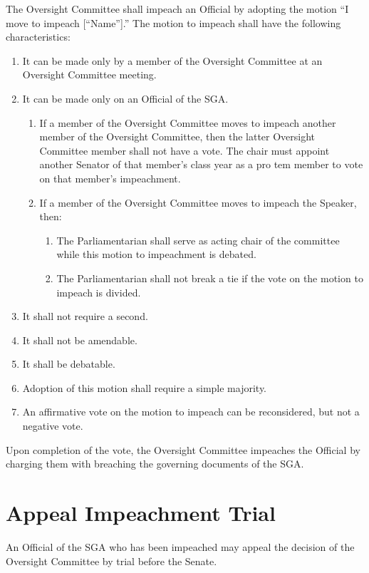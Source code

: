 \documentclass[12pt]{scrreprt}
\begin{document}
The Oversight Committee shall impeach an Official by adopting the motion “I move to impeach
[“Name”].” The motion to impeach shall have the following characteristics: 
\begin{enumerate}
    \item It can be made only by a member of the Oversight Committee at an Oversight Committee
meeting.
    \item It can be made only on an Official of the SGA.
    \begin{enumerate}
        \item If a member of the Oversight Committee moves to impeach another member of the
Oversight Committee, then the latter Oversight Committee member shall not have a vote.
The chair must appoint another Senator of that member’s class year as a pro tem member
to vote on that member’s impeachment.
        \item If a member of the Oversight Committee moves to impeach the Speaker, then:
        \begin{enumerate}
            \item The Parliamentarian shall serve as acting chair of the committee while this
motion to impeachment is debated.
            \item The Parliamentarian shall not break a tie if the vote on the motion to impeach is divided.
        \end{enumerate}
    \end{enumerate}
    \item It shall not require a second.
    \item It shall not be amendable.
    \item It shall be debatable.
    \item  Adoption of this motion shall require a simple majority.
    \item An affirmative vote on the motion to impeach can be reconsidered, but not a negative vote.
\end{enumerate}

Upon completion of the vote, the Oversight Committee impeaches the Official by charging them with
breaching the governing documents of the SGA.


\section{Appeal Impeachment Trial}
An Official of the SGA who has been impeached may appeal the decision of the Oversight Committee by
trial before the Senate.
\end{document}
